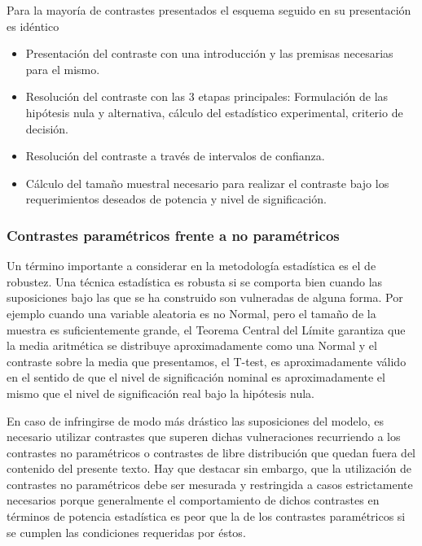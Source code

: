 \documentclass[
]{article}
\providecommand{\tightlist}{%
  \setlength{\itemsep}{0pt}\setlength{\parskip}{0pt}}
\begin{document}
Para la mayoría de contrastes presentados el esquema seguido en su presentación es idéntico

\begin{itemize}
\tightlist
\item
  Presentación del contraste con una introducción y las premisas necesarias para el mismo.
\item
  Resolución del contraste con las 3 etapas principales: Formulación de las hipótesis nula y alternativa, cálculo del estadístico experimental, criterio de decisión.
\item
  Resolución del contraste a través de intervalos de confianza.
\item
  Cálculo del tamaño muestral necesario para realizar el contraste bajo los requerimientos deseados de potencia y nivel de significación.
\end{itemize}

\subsubsection{Contrastes paramétricos frente a no paramétricos}\label{contrastes-paramuxe9tricos-frente-a-no-paramuxe9tricos}

Un término importante a considerar en la metodología estadística es el de robustez. Una técnica estadística es robusta si se comporta bien cuando las suposiciones bajo las que se ha construido son vulneradas de alguna forma. Por ejemplo cuando una variable aleatoria es no Normal, pero el tamaño de la muestra es suficientemente grande, el Teorema Central del Límite garantiza que la media aritmética se distribuye aproximadamente como una Normal y el contraste sobre la media que presentamos, el T-test, es aproximadamente válido en el sentido de que el nivel de significación nominal es aproximadamente el mismo que el nivel de significación real bajo la hipótesis nula.

En caso de infringirse de modo más drástico las suposiciones del modelo, es necesario utilizar contrastes que superen dichas vulneraciones recurriendo a los contrastes no paramétricos o contrastes de libre distribución que quedan fuera del contenido del presente texto. Hay que destacar sin embargo, que la utilización de contrastes no paramétricos debe ser mesurada y restringida a casos estrictamente necesarios porque generalmente el comportamiento de dichos contrastes en términos de potencia estadística es peor que la de los contrastes paramétricos si se cumplen las condiciones requeridas por éstos.
\end{document}
